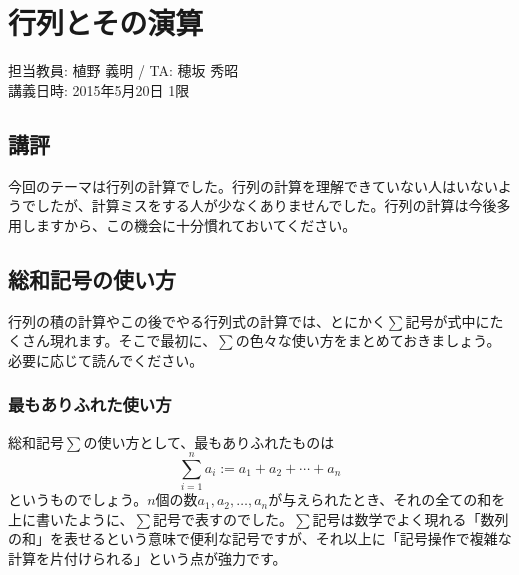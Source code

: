 \chapter{行列とその演算}

\begin{flushright}
担当教員: 植野 義明 / TA: 穂坂 秀昭 \\
講義日時: 2015年5月20日 1限
\end{flushright}

\section{講評}

今回のテーマは行列の計算でした。行列の計算を理解できていない人はいないようでしたが、計算ミスをする人が少なくありませんでした。行列の計算は今後多用しますから、この機会に十分慣れておいてください。

\section{総和記号の使い方}

行列の積の計算やこの後でやる行列式の計算では、とにかく$\sum$記号が式中にたくさん現れます。そこで最初に、$\sum$の色々な使い方をまとめておきましょう。必要に応じて読んでください。

\subsection{最もありふれた使い方}

総和記号$\sum$の使い方として、最もありふれたものは
\[
\sum_{i = 1}^n a_i := a_1 + a_2  + \cdots + a_n
\]
というものでしょう。$n$個の数$a_1,a_2,\ldots,a_n$が与えられたとき、それの全ての和を上に書いたように、$\sum$記号で表すのでした。$\sum$記号は数学でよく現れる「数列の和」を表せるという意味で便利な記号ですが、それ以上に「記号操作で複雑な計算を片付けられる」という点が強力です。

